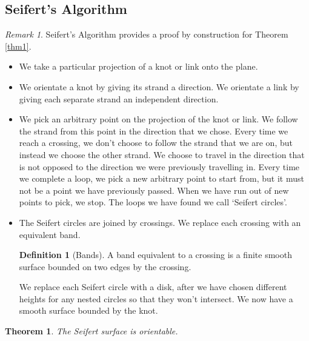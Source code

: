 \documentclass[10pt,a4paper]{report}
\newtheorem{theorem}{Theorem}[section]
\theoremstyle{definition}
\newtheorem{definition}{Definition}[section]
\theoremstyle{remark}
\newtheorem*{remark}{Remark}
\theoremstyle{example}
\begin{document}
\subsection{Seifert's Algorithm}
\begin{remark}
 Seifert's Algorithm provides a proof by construction for Theorem \ref{thm1}.
 \end{remark}
 \begin{itemize}
 \item We take a particular projection of a knot or link onto the plane.
 \item We orientate a knot by giving its strand a direction. We orientate a link by giving each separate strand an independent direction.
 \item We pick an arbitrary point on the projection of the knot or link. We follow the strand from this point in the direction that we chose. Every time we reach a crossing, we don't choose to follow the strand that we are on, but instead we choose the other strand. We choose to travel in the direction that is not opposed to the direction we were previously travelling in. Every time we complete a loop, we pick a new arbitrary point to start from, but it must not be a point we have previously passed. When we have run out of new points to pick, we stop. The loops we have found we call `Seifert circles'.
\item The Seifert circles are joined by crossings. We replace each crossing with an equivalent band.
\begin{definition}[Bands]

A band equivalent to a crossing is a finite smooth surface bounded on two edges by the crossing.
\end{definition}
We replace each Seifert circle with a disk, after we have chosen different heights for any nested circles so that they won't intersect. We now have a smooth surface bounded by the knot. 
\end{itemize}

\begin{theorem}
The Seifert surface is orientable.
\end{theorem}
\end{document}
